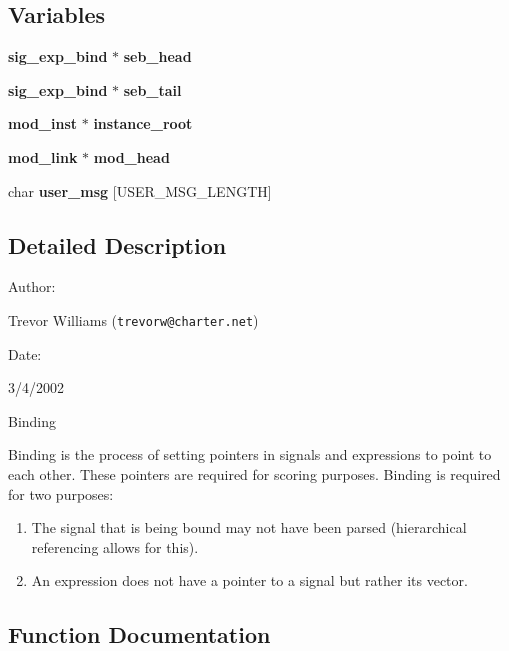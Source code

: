\subsection*{Variables}
\begin{CompactItemize}
\item 
{\bf sig\_\-exp\_\-bind} $\ast$ {\bf seb\_\-head}
\item 
{\bf sig\_\-exp\_\-bind} $\ast$ {\bf seb\_\-tail}
\item 
{\bf mod\_\-inst} $\ast$ {\bf instance\_\-root}
\item 
{\bf mod\_\-link} $\ast$ {\bf mod\_\-head}
\item 
char {\bf user\_\-msg} [USER\_\-MSG\_\-LENGTH]
\end{CompactItemize}


\subsection{Detailed Description}


\begin{Desc}
\item[Author: ]\par
Trevor Williams ({\tt trevorw@charter.net}) \end{Desc}
\begin{Desc}
\item[Date: ]\par
3/4/2002\end{Desc}
\begin{Desc}
\item[Binding]\par
 Binding is the process of setting pointers in signals and expressions to point to each other. These pointers are required for scoring purposes. Binding is required for two purposes:\begin{enumerate}
\item 
The signal that is being bound may not have been parsed (hierarchical referencing allows for this).\item 
An expression does not have a pointer to a signal but rather its vector.\end{enumerate}
\end{Desc}


\subsection{Function Documentation}

